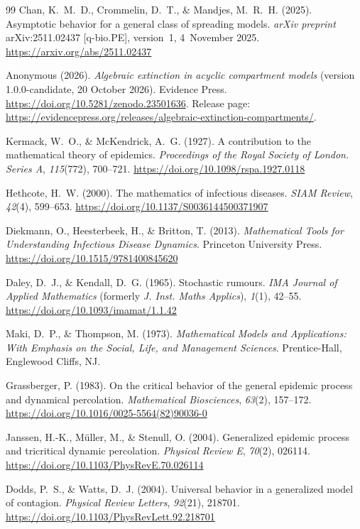 \documentclass[11pt,a4paper]{article}
\theoremstyle{definition}\newtheorem{definition}[theorem]{Definition}
\theoremstyle{remark}\newtheorem{remark}[theorem]{Remark}
\begin{document}
\begin{thebibliography}{99}
Chan, K.~M.~D., Crommelin, D.~T., \& Mandjes, M.~R.~H. (2025).
Asymptotic behavior for a general class of spreading models.
\emph{arXiv preprint} arXiv:2511.02437 [q-bio.PE], version~1, 4~November 2025.
\url{https://arxiv.org/abs/2511.02437}

Anonymous (2026).
\emph{Algebraic extinction in acyclic compartment models} (version 1.0.0-candidate, 20 October 2026).
Evidence Press.
\url{https://doi.org/10.5281/zenodo.23501636}.
Release page: \url{https://evidencepress.org/releases/algebraic-extinction-compartments/}.

Kermack, W.~O., \& McKendrick, A.~G. (1927).
A contribution to the mathematical theory of epidemics.
\emph{Proceedings of the Royal Society of London. Series A}, \emph{115}(772), 700--721.
\url{https://doi.org/10.1098/rspa.1927.0118}

Hethcote, H.~W. (2000).
The mathematics of infectious diseases.
\emph{SIAM Review}, \emph{42}(4), 599--653.
\url{https://doi.org/10.1137/S0036144500371907}

Diekmann, O., Heesterbeek, H., \& Britton, T. (2013).
\emph{Mathematical Tools for Understanding Infectious Disease Dynamics}.
Princeton University Press.
\url{https://doi.org/10.1515/9781400845620}

Daley, D.~J., \& Kendall, D.~G. (1965).
Stochastic rumours.
\emph{IMA Journal of Applied Mathematics} (formerly \emph{J. Inst. Maths Applics}), \emph{1}(1), 42--55.
\url{https://doi.org/10.1093/imamat/1.1.42}

Maki, D.~P., \& Thompson, M. (1973).
\emph{Mathematical Models and Applications: With Emphasis on the Social, Life, and Management Sciences}.
Prentice-Hall, Englewood Cliffs, NJ.

Grassberger, P. (1983).
On the critical behavior of the general epidemic process and dynamical percolation.
\emph{Mathematical Biosciences}, \emph{63}(2), 157--172.
\url{https://doi.org/10.1016/0025-5564(82)90036-0}

Janssen, H.-K., M\"uller, M., \& Stenull, O. (2004).
Generalized epidemic process and tricritical dynamic percolation.
\emph{Physical Review E}, \emph{70}(2), 026114.
\url{https://doi.org/10.1103/PhysRevE.70.026114}

Dodds, P.~S., \& Watts, D.~J. (2004).
Universal behavior in a generalized model of contagion.
\emph{Physical Review Letters}, \emph{92}(21), 218701.
\url{https://doi.org/10.1103/PhysRevLett.92.218701}


\end{thebibliography}
\end{document}
